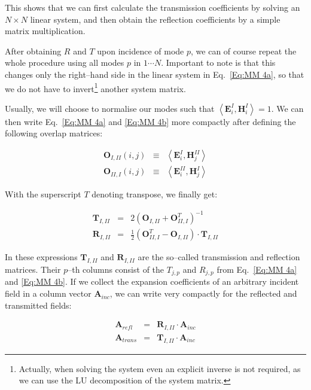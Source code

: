 This shows that we can first calculate the transmission coefficients by solving
an $N \times N$ linear system, and then obtain the reflection coefficients
by a simple matrix multiplication.

After obtaining $R$ and $T$ upon incidence of mode $p$, we can
of course repeat the whole procedure using all modes $p$ in $ 1 \cdots N$.
Important to note is that this changes only the right--hand side in the linear system in Eq.~\ref{Eq:MM 4a}, so that we do not have to invert\footnote{%
Actually, when solving the system even an explicit inverse is not required,
as we can use the LU decomposition of the system matrix.
} another system matrix. 

Usually, we will choose to normalise our modes such that \( \left\langle \mathbf{E}^{I}_{i},\mathbf{H}^{I}_{i}\right\rangle =1 \).
We can then write Eq.~\ref{Eq:MM 4a} and \ref{Eq:MM 4b} more compactly after
defining the following overlap matrices:

\begin{eqnarray}
\mathbf{O}_{I,II}\left( i,j\right)  & \equiv  & \left\langle \mathbf{E}^{I}_{i},\mathbf{H}^{II}_{j}\right\rangle \label{Eq:O_I_II} \\
\mathbf{O}_{II,I}\left( i,j\right)  & \equiv  & \left\langle \mathbf{E}^{II}_{i},\mathbf{H}^{I}_{j}\right\rangle \label{Eq:O_II_I} 
\end{eqnarray}


With the superscript $T$ denoting transpose, we finally get:

\begin{eqnarray}
\mathbf{T}_{I,II} & = & 2\left( \mathbf{O}_{I,II}+\mathbf{O}^{T}_{II,I}\right) ^{-1}\label{Eq:MM 5a} \\
\mathbf{R}_{I,II} & = & \frac{1}{2}\left( \mathbf{O}^{T}_{II,I}-\mathbf{O}_{I,II}\right) \cdot \mathbf{T}_{I,II}\label{Eq:MM 5b} 
\end{eqnarray}


In these expressions $\mathbf{T}_{I,II}$ and $\mathbf{R}_{I,II}$ are
the so--called transmission and reflection matrices. Their \( p \)--th columns
consist of the $T_{j,p}$ and $R_{j,p}$ from Eq.~\ref{Eq:MM 4a} and
\ref{Eq:MM 4b}. If we collect the expansion coefficients of an arbitrary incident
field in a column vector $\mathbf{A}_{inc}$, we can write very compactly
for the reflected and transmitted fields: 

\begin{eqnarray}
\mathbf{A}_{refl} & = & \mathbf{R}_{I,II}\cdot \mathbf{A}_{inc}\label{Eq:R matrix} \\
\mathbf{A}_{trans} & = & \mathbf{T}_{I,II}\cdot \mathbf{A}_{inc}\label{Eq:T matrix} 
\end{eqnarray}

